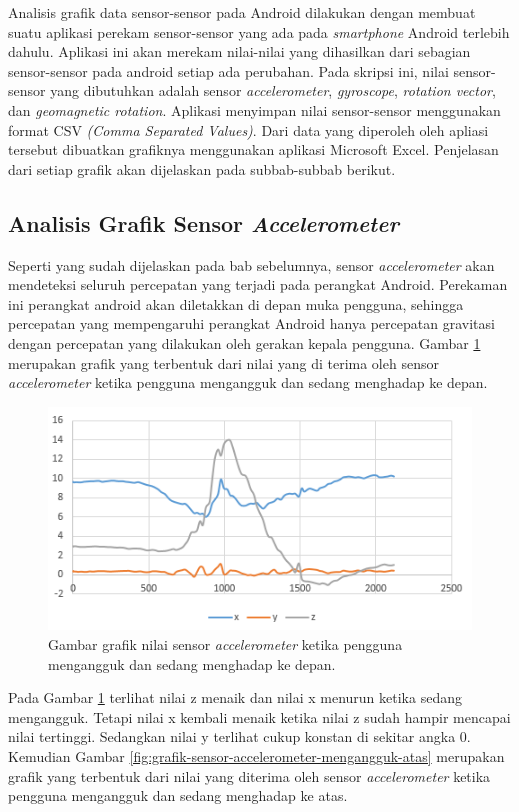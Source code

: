 Analisis grafik data sensor-sensor pada Android dilakukan dengan membuat suatu aplikasi perekam sensor-sensor yang ada pada \textit{smartphone} Android terlebih dahulu. Aplikasi ini akan merekam nilai-nilai yang dihasilkan dari sebagian sensor-sensor pada android setiap ada perubahan. Pada skripsi ini, nilai sensor-sensor yang dibutuhkan adalah sensor \textit{accelerometer}, \textit{gyroscope}, \textit{rotation vector}, dan \textit{geomagnetic rotation}. Aplikasi menyimpan nilai sensor-sensor menggunakan format CSV \textit{(Comma Separated Values)}. Dari data yang diperoleh oleh apliasi tersebut dibuatkan grafiknya menggunakan aplikasi Microsoft Excel. Penjelasan dari setiap grafik akan dijelaskan pada subbab-subbab berikut.
\subsection{Analisis Grafik Sensor \textit{Accelerometer}}
\label{sec:analisis_grafik_sensor_accelerometer}
Seperti yang sudah dijelaskan pada bab sebelumnya, sensor \textit{accelerometer} akan mendeteksi seluruh percepatan yang terjadi pada perangkat Android. Perekaman ini perangkat android akan diletakkan di depan muka pengguna, sehingga percepatan yang mempengaruhi perangkat Android hanya percepatan gravitasi dengan percepatan yang dilakukan oleh gerakan kepala pengguna. Gambar \ref{fig:grafik-sensor-accelerometer-mengangguk-depan} merupakan grafik yang terbentuk dari nilai yang di terima oleh sensor \textit{accelerometer} ketika pengguna mengangguk dan sedang menghadap ke depan.

\begin{figure}[htbp]
\centering
\includegraphics[scale=1]{Gambar/grafik-sensor-accelerometer-mengangguk-depan.png}
\caption{Gambar grafik nilai sensor \textit{accelerometer} ketika pengguna mengangguk dan sedang menghadap ke depan.} 
\label{fig:grafik-sensor-accelerometer-mengangguk-depan}
\end{figure}
Pada Gambar \ref{fig:grafik-sensor-accelerometer-mengangguk-depan} terlihat nilai z menaik dan nilai x menurun ketika sedang mengangguk. Tetapi nilai x kembali menaik ketika nilai z sudah hampir mencapai nilai tertinggi. Sedangkan nilai y terlihat cukup konstan di sekitar angka 0. Kemudian Gambar \ref{fig:grafik-sensor-accelerometer-mengangguk-atas} merupakan grafik yang terbentuk dari nilai yang diterima oleh sensor \textit{accelerometer} ketika pengguna mengangguk dan sedang menghadap ke atas.


